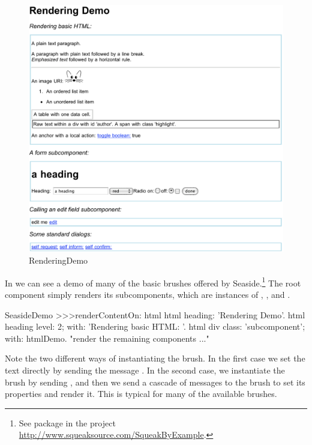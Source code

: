 \documentclass[a4paper,10pt,twoside]{book}
\begin{document}
\begin{figure}[ht]
\begin{center}
\includegraphics[width=\textwidth]{RenderingDemo}
\caption{RenderingDemo}
\label{fig:RenderingDemo}
\end{center}
\end{figure}


In  we can see a demo of many of the basic brushes offered by Seaside.\footnote{See package  in the project \url{http://www.squeaksource.com/SqueakByExample}.}
The root component  simply renders its subcomponents, which are instances of , ,  and .

\begin{code}{}
SeasideDemo >>>renderContentOn: html
	html heading: 'Rendering Demo'.
	html heading
		level: 2;
		with: 'Rendering basic HTML: '.
	html div
		class: 'subcomponent';
		with: htmlDemo.
	"render the remaining components ..."
\end{code}

Note the two different ways of instantiating the  brush.
In the first case we set the text directly by sending the message .
In the second case, we instantiate the brush by sending , and then we send a cascade of messages to the brush to set its properties and render it.
This is typical for many of the available brushes.
\end{document}
